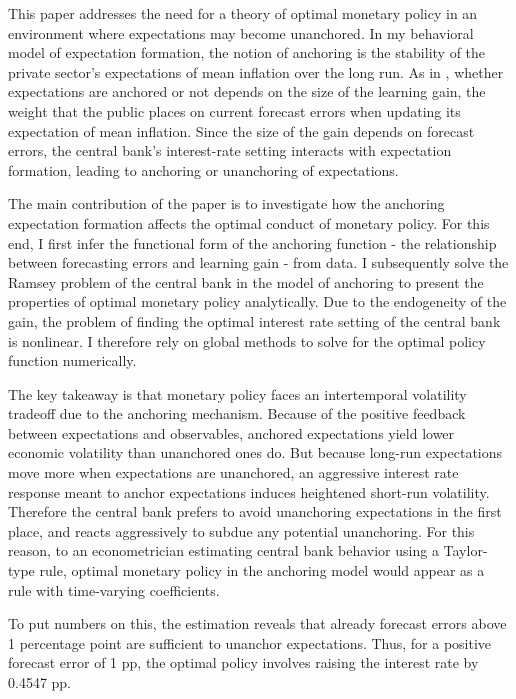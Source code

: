 \documentclass[11pt]{article}
\renewcommand{\[}{\begin{equation}}
\renewcommand{\]}{\end{equation}}
\def\ppFEunanchors{1 }
\def\ppMoveFFR{0.4547 }
\begin{document}
This paper addresses the need for a theory of optimal monetary policy in an environment where expectations may become unanchored. In my behavioral model of expectation formation, the notion of anchoring is the stability of the private sector's expectations of mean inflation over the long run. As in \cite{carvalho2019anchored}, whether expectations are anchored or not depends on the size of the learning gain, the weight that the public places on current forecast errors when updating its expectation of mean inflation. Since the size of the gain depends on forecast errors, the central bank's interest-rate setting interacts with expectation formation, leading to anchoring or unanchoring of expectations.

The main contribution of the paper is to investigate how the anchoring expectation formation affects the optimal conduct of monetary policy. For this end, I first infer the functional form of the anchoring function - the relationship between forecasting errors and learning gain -  from data. I subsequently solve the Ramsey problem of the central bank in the model of anchoring to present the properties of optimal monetary policy analytically. Due to the endogeneity of the gain, the problem of finding the optimal interest rate setting of the central bank is nonlinear. I therefore rely on global methods to solve for the optimal policy function numerically.

The key takeaway is that monetary policy faces an intertemporal volatility tradeoff due to the anchoring mechanism. Because of the positive feedback between expectations and observables, anchored expectations yield lower economic volatility than unanchored ones do. But because long-run expectations move more when expectations are unanchored, an aggressive interest rate response meant to anchor expectations induces heightened short-run volatility. Therefore the central bank prefers to avoid unanchoring expectations in the first place, and reacts aggressively to subdue any potential unanchoring. For this reason, to an econometrician estimating central bank behavior using a Taylor-type rule, optimal monetary policy in the anchoring model would appear as a rule with time-varying coefficients. 

To put numbers on this, the estimation reveals that already forecast errors above \ppFEunanchors percentage point are sufficient to unanchor expectations. Thus, for a positive forecast error of \ppFEunanchors pp, the optimal policy involves raising the interest rate by \ppMoveFFR pp.
\end{document}
